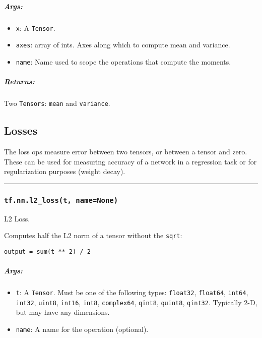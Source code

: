 \subparagraph{Args: }\label{args-15}

\begin{itemize}
\tightlist
\item
  \texttt{x}: A \texttt{Tensor}.
\item
  \texttt{axes}: array of ints. Axes along which to compute mean and
  variance.
\item
  \texttt{name}: Name used to scope the operations that compute the
  moments.
\end{itemize}

\subparagraph{Returns: }\label{returns-15}

Two \texttt{Tensors}: \texttt{mean} and \texttt{variance}.

\subsection{Losses }\label{losses}

The loss ops measure error between two tensors, or between a tensor and
zero. These can be used for measuring accuracy of a network in a
regression task or for regularization purposes (weight decay).

\begin{center}\rule{0.5\linewidth}{\linethickness}\end{center}

\subsubsection{\texorpdfstring{\texttt{tf.nn.l2\_loss(t,\ name=None)}
}{tf.nn.l2\_loss(t, name=None) }}\label{tf.nn.l2ux5flosst-namenone}

L2 Loss.

Computes half the L2 norm of a tensor without the \texttt{sqrt}:

\begin{verbatim}
output = sum(t ** 2) / 2
\end{verbatim}

\subparagraph{Args: }\label{args-16}

\begin{itemize}
\tightlist
\item
  \texttt{t}: A \texttt{Tensor}. Must be one of the following types:
  \texttt{float32}, \texttt{float64}, \texttt{int64}, \texttt{int32},
  \texttt{uint8}, \texttt{int16}, \texttt{int8}, \texttt{complex64},
  \texttt{qint8}, \texttt{quint8}, \texttt{qint32}. Typically 2-D, but
  may have any dimensions.
\item
  \texttt{name}: A name for the operation (optional).
\end{itemize}

